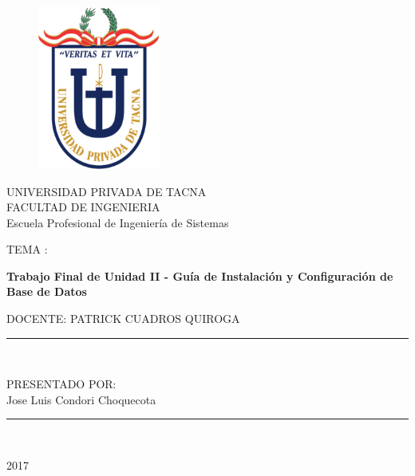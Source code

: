 \documentclass[a4paper,openright,12pt]{book}
\begin{document}
\begin{titlepage}
\begin{center}
\begin{figure}[htb]
\begin{center}
\includegraphics[width=4cm]{./images/upt}
\end{center}
\end{figure}

UNIVERSIDAD PRIVADA DE TACNA\\
\vspace*{0.10in}
FACULTAD DE INGENIERIA\\
Escuela Profesional de Ingeniería de Sistemas\\
\vspace*{0.2in}
\begin{large}
TEMA : \\
\end{large}
\vspace*{0.2in}
\begin{Large}
\textbf{Trabajo Final de Unidad II - Guía de Instalación y Configuración de Base de Datos} \\
\end{Large}
\vspace*{0.3in}
\begin{large}
DOCENTE: PATRICK CUADROS QUIROGA\\
\end{large}
\vspace*{0.3in}
\rule{80mm}{0.1mm}\\
\vspace*{0.1in}
\begin{large}
PRESENTADO POR: \\
Jose Luis Condori Choquecota \\


\end{large}
\rule{80mm}{0.1mm}\\
\begin{large}
2017\\
\end{large}
\end{center}
\end{titlepage}
\end{document}
